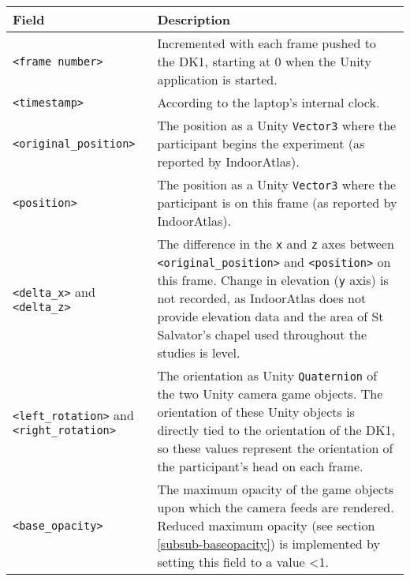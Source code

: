 \begin{center}
\begin{longtable}{ l  p{6.5cm} }

\toprule

\textbf{Field} & \textbf{Description} \\

\midrule

\texttt{<frame number>} & Incremented with each frame pushed to the DK1, starting at 0 when the Unity application is started. \\

\midrule

\texttt{<timestamp>} & According to the laptop's internal clock. \\

\midrule

\texttt{<original\_position>} & The position as a Unity \texttt{Vector3} where the participant begins the experiment (as reported by IndoorAtlas). \\

\midrule

\texttt{<position>} & The position as a Unity \texttt{Vector3} where the participant is on this frame (as reported by IndoorAtlas). \\

\midrule

\texttt{<delta\_x>} and \texttt{<delta\_z>} & The difference in the \texttt{x} and \texttt{z} axes between \texttt{<original\_position>} and \texttt{<position>} on this frame. Change in elevation (\texttt{y} axis) is not recorded, as IndoorAtlas does not provide elevation data and the area of St Salvator's chapel used throughout the studies is level. \\

\midrule

\texttt{<left\_rotation>} and \texttt{<right\_rotation>} & The orientation as Unity \texttt{Quaternion} of the two Unity camera game objects. The orientation of these Unity objects is directly tied to the orientation of the DK1, so these values represent the orientation of the participant's head on each frame. \\

\midrule

\texttt{<base\_opacity>} & The maximum opacity of the game objects upon which the camera feeds are rendered. Reduced maximum opacity (see section \ref{subsub-baseopacity}) is implemented by setting this field to a value \textless 1. \\


\end{longtable}
\end{center}
